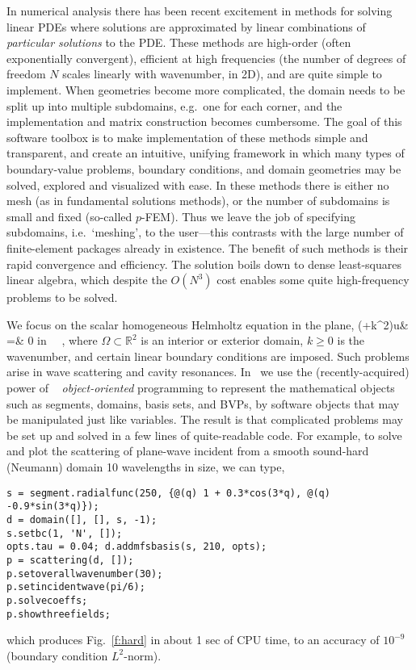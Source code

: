 \documentclass[12pt]{article}
\begin{document}
In numerical analysis there has been recent excitement
in methods for solving linear PDEs where solutions are approximated by
linear combinations of {\em particular solutions} to the PDE.
These methods are high-order (often exponentially convergent),
efficient at high frequencies (the number of degrees of freedom $N$
scales linearly with wavenumber, in 2D),
and are quite simple to implement.
When geometries become more complicated, the domain needs to be split
up into multiple subdomains, e.g.\ one for each corner, and the
implementation and matrix construction becomes cumbersome.
The goal of this software toolbox is to make implementation of
these methods simple
and transparent, and create an intuitive, unifying framework in which many
types of boundary-value problems,
boundary conditions, and domain geometries
may be solved, explored and visualized with ease.
In these methods there is either no mesh (as in
fundamental solutions methods), or
the number of subdomains is small and fixed
(so-called $p$-FEM).
Thus we leave the job of specifying subdomains, i.e.\ `meshing',
to the user---this contrasts with the large number of
finite-element packages already in existence.
The benefit of such methods is their rapid convergence and efficiency.
The solution boils down to dense least-squares linear algebra,
which despite the $O(N^3)$ cost enables some quite high-frequency problems
to be solved.

We focus on the scalar homogeneous
Helmholtz equation in the plane,
\bea
(\Delta+k^2)u& =& 0 \qquad \mbox{in } \Omega~,
\eea
where $\Omega \subset \mathbb{R}^2$ is an interior or exterior
domain, $k\ge 0$ is the wavenumber, and certain
linear boundary conditions are imposed.
Such problems arise in wave scattering and cavity resonances.
In \mpspack\ we use the (recently-acquired)
power of \matlab\ \cite{matlab} {\em object-oriented}
programming to represent the 
mathematical objects such as segments, domains,
basis sets, and BVPs, by software objects that may be manipulated
just like variables.
The result is that complicated problems may be set up and solved in
a few lines of quite-readable code.
For example, to solve and plot the scattering
of plane-wave incident from a smooth sound-hard (Neumann) domain
10 wavelengths in size, we can type,
\begin{verbatim}
s = segment.radialfunc(250, {@(q) 1 + 0.3*cos(3*q), @(q) -0.9*sin(3*q)});
d = domain([], [], s, -1);
s.setbc(1, 'N', []);
opts.tau = 0.04; d.addmfsbasis(s, 210, opts);
p = scattering(d, []);
p.setoverallwavenumber(30);
p.setincidentwave(pi/6);
p.solvecoeffs;
p.showthreefields;
\end{verbatim}
which produces Fig.~\ref{f:hard} in about 1 sec of CPU time,
to an accuracy of $10^{-9}$ (boundary condition $L^2$-norm).
\end{document}

